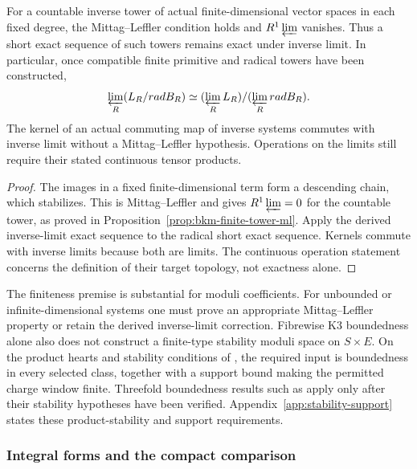\begin{proposition}
\label{prop:sectorial-hall-truncation}
For a countable inverse tower of actual finite-dimensional
vector spaces in each fixed degree, the Mittag--Leffler
condition holds and $R^1\varprojlim$ vanishes. Thus a short
exact sequence of such towers remains exact under inverse
limit. In particular, once compatible finite primitive and
radical towers have been constructed,
\[
 \varprojlim_R(L_R/\operatorname{rad}B_R)
 \simeq(\varprojlim_RL_R)/(\varprojlim_R\operatorname{rad}B_R).
\]
The kernel of an actual commuting map of inverse systems
commutes with inverse limit without a Mittag--Leffler
hypothesis. Operations on the limits still require their
stated continuous tensor products.
\end{proposition}

\begin{proof}
The images in a fixed finite-dimensional term form a descending
chain, which stabilizes. This is Mittag--Leffler and gives
$R^1\varprojlim=0$ for the countable tower, as proved in
Proposition~\ref{prop:bkm-finite-tower-ml}. Apply the derived
inverse-limit exact sequence to the radical short exact
sequence. Kernels commute with inverse limits because both
are limits. The continuous operation statement concerns the
definition of their target topology, not exactness alone.
\end{proof}

The finiteness premise is substantial for moduli coefficients.
For unbounded or infinite-dimensional systems one must prove
an appropriate Mittag--Leffler property or retain the derived
inverse-limit correction. Fibrewise K3 boundedness alone also
does not construct a finite-type stability moduli space on
$S\times E$. On the product hearts and stability conditions of
\cite{AbramovichPolishchukTStructures,LiuProductStability},
the required input is boundedness in every selected class,
together with a support bound making the permitted charge
window finite. Threefold boundedness results such as
\cite{PiyaratneTodaModuli3folds} apply only after their stability
hypotheses have been verified. Appendix~\ref{app:stability-support}
states these product-stability and support requirements.

\subsubsection*{Integral forms and the compact comparison}

